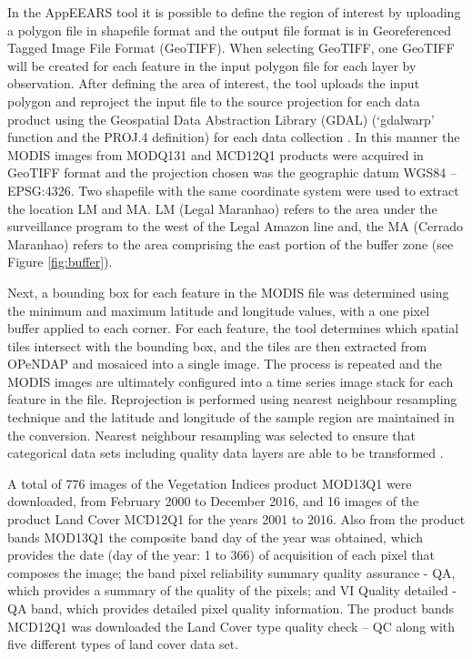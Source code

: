 In the AppEEARS tool it is possible to define the region of interest by uploading a polygon file in shapefile format and the output file format is in Georeferenced Tagged Image File Format (GeoTIFF). When selecting GeoTIFF, one GeoTIFF will be created for each feature in the input polygon file for each layer by observation. After defining the area of interest, the tool uploads the input polygon and reproject the input file to the source projection for each data product using the Geospatial Data Abstraction Library (GDAL) (‘gdalwarp’ function and the PROJ.4 definition) for each data collection \citep{usgs_2018}. In this manner the MODIS images from MODQ131 and MCD12Q1 products were acquired in GeoTIFF format and the projection chosen was the geographic datum WGS84 – EPSG:4326. Two shapefile with the same coordinate system were used to extract the location LM and MA. LM (Legal Maranhao) refers to the area under the surveillance program to the west of the Legal Amazon line and, the MA (Cerrado Maranhao) refers to the area comprising the east portion of the buffer zone (see Figure \ref{fig:buffer}).

Next, a bounding box for each feature in the MODIS file was determined using the minimum and maximum latitude and longitude values, with a one pixel buffer applied to each corner. For each feature, the tool determines which spatial tiles intersect with the bounding box, and the tiles are then extracted from OPeNDAP \citep{ cornillon_2003} and mosaiced into a single image. The process is repeated and the MODIS images are ultimately configured into a time series image stack for each feature in the file. Reprojection is performed using nearest neighbour resampling technique and the latitude and longitude of the sample region are maintained in the conversion. Nearest neighbour resampling was selected to ensure that categorical data sets including quality data layers are able to be transformed \citep{usgs_2018}. 

A total of 776 images of the Vegetation Indices product MOD13Q1 were downloaded, from February 2000 to December 2016, and 16 images of the product Land Cover MCD12Q1 for the years 2001 to 2016. Also from the product bands MOD13Q1 the composite band day of the year was obtained, which provides the date (day of the year: 1 to 366) of acquisition of each pixel that composes the image; the band pixel reliability summary quality assurance - QA, which provides a summary of the quality of the pixels; and VI Quality detailed - QA band, which provides detailed pixel quality information. The product bands MCD12Q1 was downloaded the Land Cover type quality check – QC along with five different types of land cover data set.


